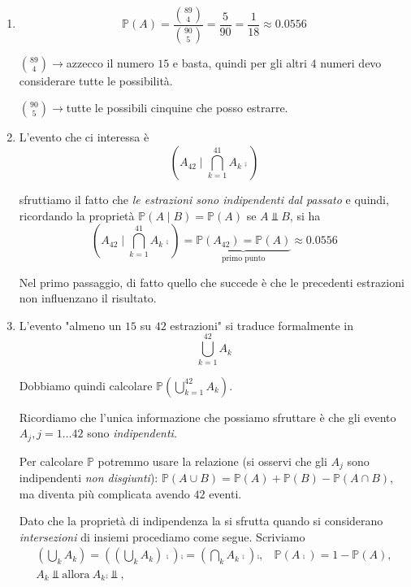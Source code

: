 \begin{enumerate}
\item \begin{equation*}
\mathbb{P}( A) =\frac{\binom{89}{4}}{\binom{90}{5}} =\frac{5}{90} =\frac{1}{18} \approx 0.0556
\end{equation*}

$\binom{89}{4}\rightarrow $azzecco il numero $15$ e basta, quindi per gli altri $4$ numeri devo considerare tutte le possibilità.

$\binom{90}{5}\rightarrow $tutte le possibili cinquine che posso estrarre.
\item L'evento che ci interessa è\begin{equation*}
\left( A_{42} \mid \bigcap _{k=1}^{41} A_{k}\comp\right)
\end{equation*}

sfruttiamo il fatto che \textit{le estrazioni sono indipendenti dal passato} e quindi, ricordando la proprietà $\mathbb{P}( A\mid B) =\mathbb{P}( A)$ se $A\Bot B$, si ha\begin{equation*}
\left( A_{42} \mid\bigcap _{k=1}^{41} A_{k}\comp\right) =\underbrace{\mathbb{P}( A_{42}) =\mathbb{P}( A)}_{\text{primo punto}} \approx 0.0556
\end{equation*}

Nel primo passaggio, di fatto quello che succede è che le precedenti estrazioni non influenzano il risultato.
\item L'evento "almeno un $15$ su $42$ estrazioni" si traduce formalmente in\begin{equation*}
\bigcup _{k=1}^{42} A_{k}
\end{equation*}

Dobbiamo quindi calcolare $\mathbb{P}\left(\bigcup _{k=1}^{42} A_{k}\right)$.

Ricordiamo che l'unica informazione che possiamo sfruttare è che gli evento $A_{j} ,j=1\dotsc 42$ sono \textit{indipendenti}.

Per calcolare $\mathbb{P}$ potremmo usare la relazione (si osservi che gli $A_{j}$ sono indipendenti \textit{non disgiunti}): $\mathbb{P}( A\cup B) =\mathbb{P}( A) +\mathbb{P}( B) -\mathbb{P}( A\cap B)$, ma diventa più complicata avendo $42$ eventi.

Dato che la proprietà di indipendenza la si sfrutta quando si considerano \textit{intersezioni} di insiemi procediamo come segue. Scriviamo\begin{gather*}
\left(\bigcup _{k} A_{k}\right) =\left(\left(\bigcup _{k} A_{k}\right)\comp\right)\comp =\left(\bigcap _{k} A_{k}\comp\right)\comp ,\ \ \ \ \mathbb{P}\left( A\comp\right) =1-\mathbb{P}( A) ,\\
A_{k} \Bot \text{allora} \ A_{k}\comp \Bot ,
\end{gather*}


\end{enumerate}
